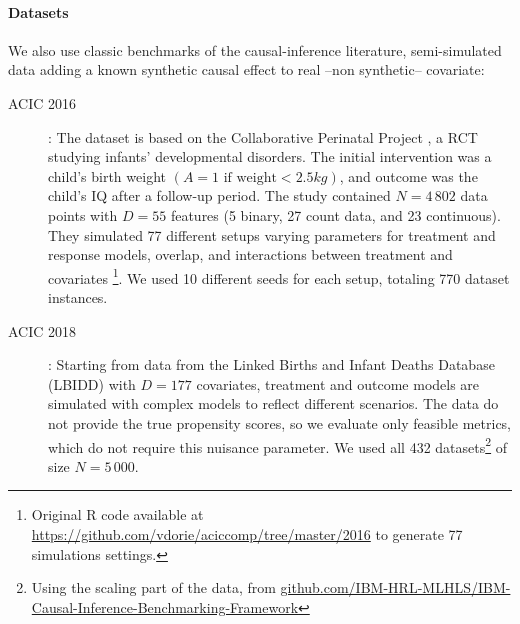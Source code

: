 \documentclass[french,12pt,twoside,a4paper]{book}
\begin{document}
\paragraph{Datasets}

We also use classic benchmarks of the causal-inference
literature, semi-simulated data adding a known synthetic causal effect to real --non synthetic-- covariate:
\begin{description}
  \item[ACIC 2016] \citep{dorie_automated_2019}: The dataset is based on the
    Collaborative Perinatal Project \citep{niswander_women_1972}, a RCT
    studying infants’
    developmental disorders. The initial intervention was a child’s birth
    weight $(A = 1 \text{ if weight} < 2.5 kg)$, and outcome was the child’s
    IQ after a follow-up period. The study contained $N=4\,802$ data
    points with $D=55$ features (5 binary, 27 count data, and 23
    continuous). They simulated 77 different setups varying parameters
    for treatment and response models, overlap, and interactions between treatment and
    covariates \footnote{Original R code available at
      \url{https://github.com/vdorie/aciccomp/tree/master/2016}
      to generate 77 simulations settings.}. We used 10 different seeds for
    each setup, totaling 770 dataset instances.

  \item[ACIC 2018] \citep{shimoni_benchmarking_2018}: Starting from data
    from the Linked Births and Infant Deaths Database (LBIDD)
    \citep{macdorman_infant_1998} with $D=177$ covariates, treatment and
    outcome models are simulated with complex models to reflect
    different scenarios. The data do not provide the true propensity
    scores, so we evaluate only feasible metrics, which do not require this
    nuisance parameter. We used all 432 datasets\footnote{Using the scaling part of the data, from
      \href{https://github.com/IBM-HRL-MLHLS/IBM-Causal-Inference-Benchmarking-Framework}{github.com/IBM-HRL-MLHLS/IBM-Causal-Inference-Benchmarking-Framework}} of size $N=5\,000$.



\end{description}
\end{document}
